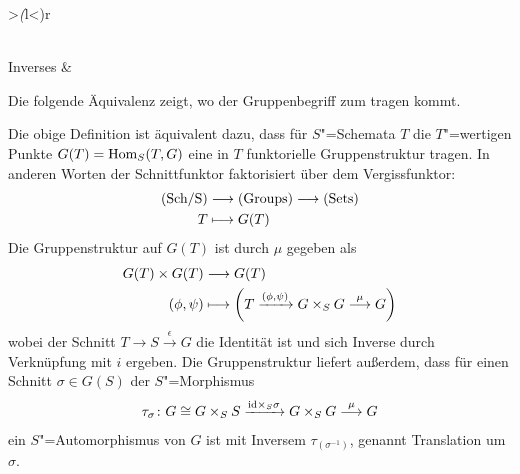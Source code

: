 \begin{Definition}[Gruppenschema]
\begin{tabular}{>{\itshape(}l<{)}r}
    \\[3.5em]
    Inverses
    &
  \end{tabular}
\end{Definition}
Die folgende Äquivalenz zeigt, wo der Gruppenbegriff zum tragen kommt.
\begin{Bemerkung}
  Die obige Definition ist äquivalent dazu, dass für $S$"=Schemata $T$
  die $T$"=wertigen Punkte $G(T)=\operatorname{Hom}_S(T,G)$ eine in $T$ funktorielle
  Gruppenstruktur tragen.
  In anderen Worten der Schnittfunktor faktorisiert über dem
  Vergissfunktor:
  \begin{align*}
    \Sch &\longto \Groups \longto \text{(Sets)}\\
    T &\longmapsto G(T)
  \end{align*}
  Die Gruppenstruktur auf $G(T)$ ist durch $\mu$ gegeben als
  \begin{align*}
    G(T)\times G(T) &\longto G(T)\\
    (\phi, \psi) &\longmapsto 
                   \left(
                   T\xrightarrow{(\phi,\psi)} G\times_S G
                   \overset{\mu}\longto G
                   \right)
  \end{align*}
  wobei der Schnitt $T\to S\xrightarrow{\epsilon} G$ die
  Identität ist und sich Inverse durch Verknüpfung mit $i$ ergeben.
  Die Gruppenstruktur liefert außerdem, dass für einen Schnitt
  $\sigma\in G(S)$ der $S$"=Morphismus
  \begin{gather*}
    \tau_\sigma\colon G\cong G\times_S S
    \xrightarrow{\mathrm{id}\times_S\sigma}
    G\times_S G
    \overset{\mu}{\longrightarrow} G
  \end{gather*}
  ein $S$"=Automorphismus von $G$ ist mit Inversem
  $\tau_{(\sigma^{-1})}$, genannt Translation um $\sigma$.
\end{Bemerkung}


